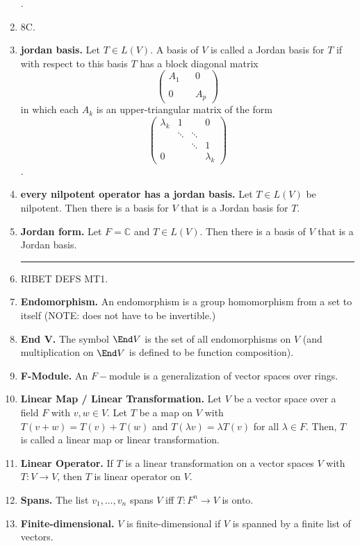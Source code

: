 \begin{enumerate}
$$	$$. 
	\item 8C. 
	\item \textbf{jordan basis. } Let $T \in L(V)$. A basis of $V$ is called a Jordan basis for $T$ if with respect to this basis $T$ has a block diagonal matrix 
	$$
	\begin{pmatrix}
	A_1 & & 0 \\
	 & & \\
	0 & & A_p
	\end{pmatrix}
	$$ in which each $A_k$ is an upper-triangular matrix of the form 
	$$
	\begin{pmatrix}
	\lambda_k & 1 & & 0 \\
	 & \ddots & \ddots & \\
	 & & \ddots & 1 \\
	0 & & & \lambda_k
	\end{pmatrix}
	$$. 
	\item \textbf{every nilpotent operator has a jordan basis. } Let $T \in L(V)$ be nilpotent. Then there is a basis for $V$ that is a Jordan basis for $T$. 
	\item \textbf{Jordan form. } Let $F = \mathbb{C}$ and $T \in L(V)$. Then there is a basis of $V$ that is a Jordan basis. 
	\begin{center}
		\hrule
	\end{center} 
	\item RIBET DEFS MT1. 
	\item \textbf{Endomorphism. } An endomorphism is a group homomorphism from a set to itself (NOTE: does not have to be invertible.)
    \item \textbf{End V. } The symbol $\End V$ is the set of all endomorphisms on $V$ (and multiplication on $\End V$ is defined to be function composition). 
    \item \textbf{F-Module. } An $F-$module is a generalization of vector spaces over rings. 
    \item \textbf{Linear Map / Linear Transformation. } Let $V$ be a vector space over a field $F$ with $v,w \in V$. Let $T$ be a map on $V$ with $T(v+w) = T(v) + T(w)$ and $T(\lambda v) = \lambda T(v)$ for all $\lambda \in F$. Then, $T$ is called a linear map or linear transformation. 
    \item \textbf{Linear Operator. } If $T$ is a linear transformation on a vector spaces $V$ with $T: V \to V$, then $T$ is linear operator on $V$. 
    \item \textbf{Spans. } The list $v_1,\dots,v_n$ spans $V$ iff $T: F^n \to V$ is onto. 
        \item \textbf{Finite-dimensional. } $V$ is finite-dimensional if $V$ is spanned by a finite list of vectors. 

\end{enumerate}
